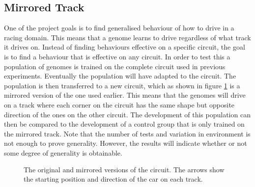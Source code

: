 


\subsection{Mirrored Track}
\label{method:mirror}
One of the project goals is to find generalised behaviour of how to drive in a racing domain. This means that a genome learns to drive regardless of what track it drives on. Instead of finding behaviours effective on a specific circuit, the goal is to find a behaviour that is effective on any circuit. In order to test this a population of genomes is trained on the complete circuit used in previous experiments. Eventually the population will have adapted to the circuit. The population is then transferred to a new circuit, which as shown in figure \ref{fig:mirrored_tracks} is a mirrored version of the one used earlier. This means that the genomes will drive on a track where each corner on the circuit has the same shape but opposite direction of the ones on the other circuit. The development of this population can then be compared to the development of a control group that is only trained on the mirrored track. Note that the number of tests and variation in environment is not enough to prove generality. However, the results will indicate whether or not some degree of generality is obtainable. 

\begin{figure}[H]
    \centering
    \qquad
   
    \caption{The original and mirrored versions of the circuit. The arrows show the starting position and direction of the car on each track.}
    \label{fig:mirrored_tracks}
\end{figure}

